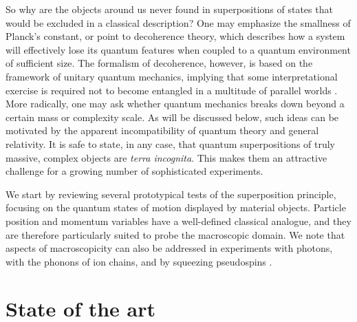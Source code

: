 \documentclass[12pt]{article}
\begin{document}
So why are the objects around us never found in superpositions of 
states that would be excluded in a classical description?
One may emphasize the smallness of Planck's constant, 
or point to decoherence
theory, which describes how a system will effectively lose its quantum features when coupled to a quantum environment of sufficient 
size\cite{Joos2003,Zurek2003}.
The formalism of decoherence, however, is based on the framework of unitary quantum mechanics,
implying that some interpretational exercise is required not to become entangled in a multitude of parallel worlds \cite{laloe2012}.
More radically, one may ask whether quantum mechanics 
breaks down beyond a certain mass or complexity scale. As will be discussed below, such ideas can be motivated by the apparent incompatibility of 
quantum theory and general relativity.
It is safe to state, in any case,  that quantum superpositions of truly massive, complex  objects  are \emph{terra incognita}.
This makes them an attractive challenge for a growing number of sophisticated experiments.

We start by reviewing several prototypical tests of the superposition principle, focusing on the quantum states of motion displayed by  material objects. Particle position and momentum variables have a 
well-defined classical analogue, and they are therefore particularly
suited to probe the macroscopic domain.
We note that aspects of macroscopicity can also be addressed in experiments with photons\cite{Fickler2012,Ma2012,Kirchmair2013}, with the phonons of ion chains\cite{Monz2011}, 
and by squeezing pseudospins 
\cite{julsgaard2001experimental,Gross2010}.

\section{State of the art}
\end{document}
